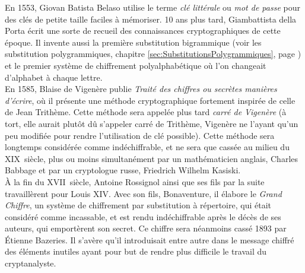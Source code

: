 


En 1553, Giovan Batista Belaso utilise le terme \emph{clé littérale}
ou \emph{mot de passe} pour des clés de petite taille faciles à
mémoriser. %
10 ans plus tard, Giambattista della Porta écrit une sorte de recueil
des connaissances cryptographiques de cette époque. Il invente aussi
la première substitution bigrammique (voir les substitution
polygrammiques, chapitre \ref{sec:SubstitutionsPolygrammiques}, page
\pageref{sec:SubstitutionsPolygrammiques}) et le premier système de
chiffrement polyalphabétique où l'on changeait d'alphabet à
chaque lettre. \\

En 1585, Blaise de Vigenère publie \emph{Traité des chiffres
  ou secrètes manières d'écrire}, où il présente une méthode
cryptographique fortement inspirée de celle de Jean Trithème. Cette
méthode sera appelée plus tard \emph{carré de Vigenère} (à tort,
elle aurait plutôt dû s'appeler carré de Trithème, Vigenère ne
l'ayant qu'un peu modifiée pour rendre l'utilisation de clé possible).
Cette méthode sera longtemps considérée comme indéchiffrable, et ne
sera que cassée au milieu du XIX\ieme~siècle, plus ou moins
simultanément par un mathématicien anglais, Charles Babbage et
par un cryptologue russe, Friedrich Wilhelm Kasiski. \\

À la fin du XVII\ieme~siècle, Antoine Rossignol ainsi que ses
fils par la suite travaillèrent pour Louis XIV. Avec son fils,
Bonaventure, il élabore le \emph{Grand Chiffre}, un système de
chiffrement par substitution à répertoire, qui était considéré comme
incassable, et est rendu indéchiffrable après le décès de ses auteurs,
qui emportèrent son secret. Ce chiffre sera néanmoins cassé 1893 par
Étienne Bazeries. Il s'avère qu'il introduisait entre autre
dans le message chiffré des éléments inutiles ayant pour but de
rendre plus difficile le travail du cryptanalyste.\\

